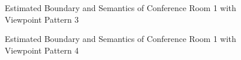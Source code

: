 \documentclass[11pt, a4paper,oneside,chapterprefix=false]{scrbook}
\begin{document}
\begin{figure}[H]
    \centering
      \label{fig:conf1 b 200 5} \hfill
     \label{fig:conf1 s 200 5}
    \caption{Estimated Boundary and Semantics of Conference Room 1 with Viewpoint Pattern 3}
    \label{fig:conf1 5}
\end{figure}

\vspace{75pt}

\begin{figure}[H]
    \centering
      \label{fig:conf1 b 200 6} \hfill
     \label{fig:conf1 s 200 6}
    \caption{Estimated Boundary and Semantics of Conference Room 1 with Viewpoint Pattern 4}
    \label{fig:conf1 6}
\end{figure}
\end{document}
